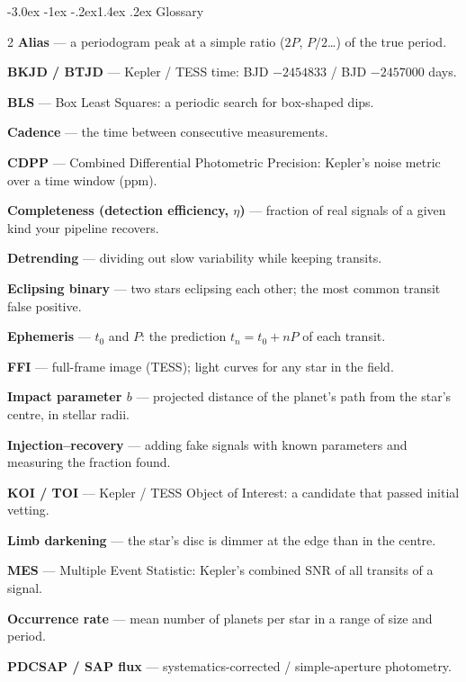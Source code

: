\documentclass[11pt,a4paper]{article}
\makeatletter
\renewcommand\section{\@startsection{section}{1}{\z@}%
  {-3.0ex \@plus -1ex \@minus -.2ex}{1.4ex \@plus .2ex}%
  {\normalfont\sffamily\LARGE\bfseries\color{navy}}}
\makeatother
\begin{document}
\section{Glossary}
\label{sec:glossary}
\begin{multicols}{2}
\small
\setlength{\parskip}{0.35em}
\textbf{Alias} --- a periodogram peak at a simple ratio (\(2P\), \(P/2\)\ldots) of the true period.

\textbf{BKJD / BTJD} --- Kepler / TESS time: BJD \(-2454833\) / BJD \(-2457000\) days.

\textbf{BLS} --- Box Least Squares: a periodic search for box-shaped dips.

\textbf{Cadence} --- the time between consecutive measurements.

\textbf{CDPP} --- Combined Differential Photometric Precision: Kepler's noise metric over a time window (ppm).

\textbf{Completeness (detection efficiency, \(\eta\))} --- fraction of real signals of a given kind your pipeline recovers.

\textbf{Detrending} --- dividing out slow variability while keeping transits.

\textbf{Eclipsing binary} --- two stars eclipsing each other; the most common transit false positive.

\textbf{Ephemeris} --- \(t_0\) and \(P\): the prediction \(t_n = t_0 + nP\) of each transit.

\textbf{FFI} --- full-frame image (TESS); light curves for any star in the field.

\textbf{Impact parameter \(b\)} --- projected distance of the planet's path from the star's centre, in stellar radii.

\textbf{Injection--recovery} --- adding fake signals with known parameters and measuring the fraction found.

\textbf{KOI / TOI} --- Kepler / TESS Object of Interest: a candidate that passed initial vetting.

\textbf{Limb darkening} --- the star's disc is dimmer at the edge than in the centre.

\textbf{MES} --- Multiple Event Statistic: Kepler's combined SNR of all transits of a signal.

\textbf{Occurrence rate} --- mean number of planets per star in a range of size and period.

\textbf{PDCSAP / SAP flux} --- systematics-corrected / simple-aperture photometry.


\end{multicols}
\end{document}

